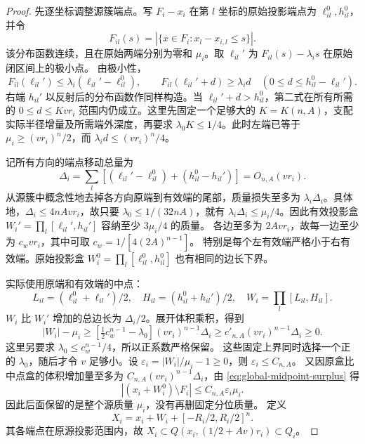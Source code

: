 \begin{proof}
先逐坐标调整源簇端点。写 \(F_i-x_i\) 在第 \(l\) 坐标的原始投影端点为
\(\ell_{il}^0,h_{il}^0\)，并令
\[
 F_{il}(s)=|\{x\in F_i:x_l-x_{i,l}\le s\}|.
\]
该分布函数连续，且在原始两端分别为零和 \(\mu_i\)。取
\(\ell_{il}'\) 为 \(F_{il}(s)-\lambda_i s\) 在原始闭区间上的极小点。
由极小性，
\begin{equation}\label{eq:global-cdf-tails}
 F_{il}(\ell_{il}')\le\lambda_i(\ell_{il}'-\ell_{il}^0),\qquad
 F_{il}(\ell_{il}'+d)\ge\lambda_i d
 \quad(0\le d\le h_{il}^0-\ell_{il}').
\end{equation}
右端 \(h_{il}'\) 以反射后的分布函数作同样构造。当
\(\ell_{il}'+d>h_{il}^0\)，第二式在所有所需的
\(0\le d\le Kvr_i\) 范围内仍成立。这里先固定一个足够大的
\(K=K(n,A)\)，支配实际半径增量及所需端外深度，再要求
\(\lambda_0K\le1/4\)。此时左端已等于
\(\mu_i\ge(vr_i)^n/2\)，而 \(\lambda_i d\le(vr_i)^n/4\)。

记所有方向的端点移动总量为
\[
 \Delta_i=\sum_l[(\ell_{il}'-\ell_{il}^0)+(h_{il}^0-h_{il}')]
            =O_{n,A}(vr_i).
\]
从源簇中概念性地去掉各方向原端到有效端的尾部，质量损失至多为
\(\lambda_i\Delta_i\)。具体地，\(\Delta_i\le4nAvr_i\)，故只要
\(\lambda_0\le1/(32nA)\)，就有
\(\lambda_i\Delta_i\le\mu_i/4\)。因此有效投影盒
\(W_i'=\prod_l[\ell_{il}',h_{il}']\) 容纳至少 \(3\mu_i/4\) 的质量。
各边至多为 \(2Avr_i\)，故每一边至少为 \(c_wvr_i\)，其中可取
\(c_w=1/[4(2A)^{n-1}]\)。
特别是每个左有效端严格小于右有效端。原始投影盒
\(W_i^0=\prod_l[\ell_{il}^0,h_{il}^0]\) 也有相同的边长下界。

实际使用原端和有效端的中点：
\[
 L_{il}=(\ell_{il}^0+\ell_{il}')/2,\quad
 H_{il}=(h_{il}^0+h_{il}')/2,\quad
 W_i=\prod_l[L_{il},H_{il}].
\]
\(W_i\) 比 \(W_i'\) 增加的总边长为 \(\Delta_i/2\)。展开体积乘积，得到
\begin{equation}\label{eq:global-midpoint-surplus}
 |W_i|-\mu_i
 \ge[\tfrac12c_w^{n-1}-\lambda_0](vr_i)^{n-1}\Delta_i
 \ge c'_{n,A}(vr_i)^{n-1}\Delta_i\ge0.
\end{equation}
这里另要求 \(\lambda_0\le c_w^{n-1}/4\)，所以正系数严格保留。
这些固定上界同时选择一个正的 \(\lambda_0\)，随后才令 \(v\) 足够小。设
\(\varepsilon_i=|W_i|/\mu_i-1\ge0\)，则 \(\varepsilon_i\le C_{n,A}\)。
又因原盒比中点盒的体积增加量至多为
\(C_{n,A}(vr_i)^{n-1}\Delta_i\)，由
\eqref{eq:global-midpoint-surplus} 得
\begin{equation}\label{eq:global-corner-missing}
 |(x_i+W_i^0)\setminus F_i|\le C_{n,A}\varepsilon_i\mu_i.
\end{equation}
因此后面保留的是整个源质量 \(\mu_i\)，没有再删固定分位质量。
定义
\begin{equation}\label{eq:global-cdf-rectangle}
 X_i=x_i+W_i+[-R_i/2,R_i/2]^n.
\end{equation}
其各端点在原源投影范围内，故
\(X_i\subset Q(x_i,(1/2+Av)r_i)\subset Q_i\)。


\end{proof}
